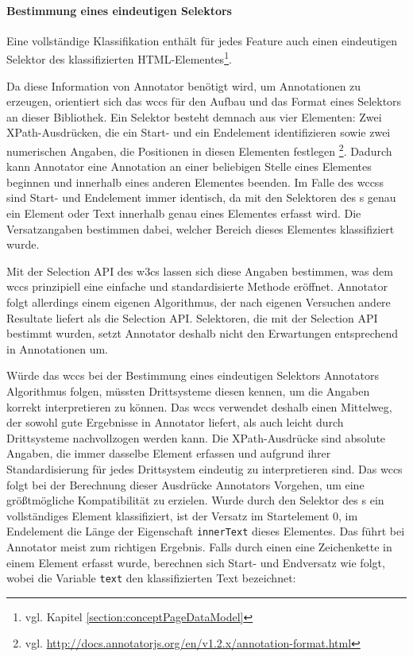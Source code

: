     \paragraph{Bestimmung eines eindeutigen Selektors}
    Eine vollständige Klassifikation enthält für jedes Feature auch einen eindeutigen
    Selektor des klassifizierten HTML-Elementes\footnote{vgl. Kapitel \ref{section:conceptPageDataModel}}.

    Da diese Information von Annotator benötigt wird,
    um Annotationen zu erzeugen,
    orientiert sich das \gls{wccs} für den Aufbau und das Format eines Selektors
    an dieser Bibliothek.
    Ein Selektor besteht demnach aus vier Elementen:
    Zwei XPath-Ausdrücken, die ein Start- und ein Endelement identifizieren
    sowie zwei numerischen Angaben, die Positionen in diesen Elementen festlegen
    \footnote{vgl. \url{http://docs.annotatorjs.org/en/v1.2.x/annotation-format.html}}.
    Dadurch kann Annotator eine Annotation an einer beliebigen Stelle eines Elementes beginnen
    und innerhalb eines anderen Elementes beenden.
    Im Falle des \glspl{wccs} sind Start- und Endelement immer identisch,
    da mit den Selektoren des {\classificationModel}s genau ein Element
    oder Text innerhalb genau eines Elementes erfasst wird.
    Die Versatzangaben bestimmen dabei, welcher Bereich dieses Elementes klassifiziert wurde.

    Mit der Selection API des \glspl{w3c} \cite{w3c:selectionAPI} lassen sich diese Angaben bestimmen,
    was dem \gls{wccs} prinzipiell eine einfache und standardisierte Methode eröffnet.
    Annotator folgt allerdings einem eigenen Algorithmus,
    der nach eigenen Versuchen andere Resultate liefert als die Selection API.
    Selektoren, die mit der Selection API bestimmt wurden,
    setzt Annotator deshalb nicht den Erwartungen entsprechend in Annotationen um.

    Würde das \gls{wccs} bei der Bestimmung eines eindeutigen Selektors Annotators
    Algorithmus folgen, müssten Drittsysteme diesen kennen,
    um die Angaben korrekt interpretieren zu können.
    Das \gls{wccs} verwendet deshalb einen Mittelweg,
    der sowohl gute Ergebnisse in Annotator liefert,
    als auch leicht durch Drittsysteme nachvollzogen werden kann.
    Die XPath-Ausdrücke sind absolute Angaben, die immer dasselbe Element erfassen und aufgrund ihrer Standardisierung
    für jedes Drittsystem eindeutig zu interpretieren sind.
    Das \gls{wccs} folgt bei der Berechnung dieser Ausdrücke Annotators Vorgehen,
    um eine größtmögliche Kompatibilität zu erzielen.
    Wurde durch den Selektor des {\classificationModel}s ein vollständiges Element klassifiziert,
    ist der Versatz im Startelement 0, im Endelement die Länge der Eigenschaft \texttt{innerText} dieses Elementes.
    Das führt bei Annotator meist zum richtigen Ergebnis.
    Falls durch einen {\xpathSelector} eine Zeichenkette in einem Element erfasst wurde,
    berechnen sich Start- und Endversatz wie folgt, wobei die Variable \texttt{text} den klassifizierten Text bezeichnet:

